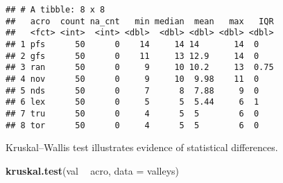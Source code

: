 \documentclass[]{book}
\newenvironment{Shaded}{\begin{snugshade}}{\end{snugshade}}
\newcommand{\DataTypeTok}[1]{\textcolor[rgb]{0.13,0.29,0.53}{#1}}
\newcommand{\KeywordTok}[1]{\textcolor[rgb]{0.13,0.29,0.53}{\textbf{#1}}}
\newcommand{\NormalTok}[1]{#1}
\newcommand{\OperatorTok}[1]{\textcolor[rgb]{0.81,0.36,0.00}{\textbf{#1}}}
\newcommand{\OtherTok}[1]{\textcolor[rgb]{0.56,0.35,0.01}{#1}}
\newcommand{\StringTok}[1]{\textcolor[rgb]{0.31,0.60,0.02}{#1}}
\begin{document}
\begin{Shaded}
\end{Shaded}

\begin{verbatim}
## # A tibble: 8 x 8
##   acro  count na_cnt   min median  mean   max   IQR
##   <fct> <int>  <int> <dbl>  <dbl> <dbl> <dbl> <dbl>
## 1 pfs      50      0    14     14 14       14  0   
## 2 gfs      50      0    11     13 12.9     14  0   
## 3 ran      50      0     9     10 10.2     13  0.75
## 4 nov      50      0     9     10  9.98    11  0   
## 5 nds      50      0     7      8  7.88     9  0   
## 6 lex      50      0     5      5  5.44     6  1   
## 7 tru      50      0     4      5  5        6  0   
## 8 tor      50      0     4      5  5        6  0
\end{verbatim}

Kruskal--Wallis test illustrates evidence of statistical differences.

\begin{Shaded}
\begin{Highlighting}[]
\KeywordTok{kruskal.test}\NormalTok{(val }\OperatorTok{~}\StringTok{ }\NormalTok{acro, }\DataTypeTok{data =}\NormalTok{ valleys)}
\end{Highlighting}
\end{Shaded}
\end{document}
